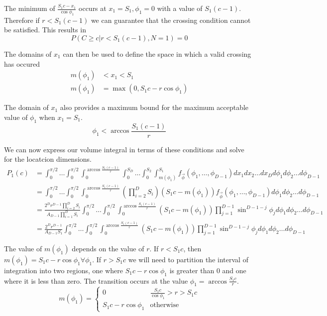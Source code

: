 \documentclass{article}
\begin{document}
The minimum of $\frac{S_1c - x_1}{\cos{\phi_1}}$ occurs at $x_1=S_1, \phi_1=0$ with a value of $S_1(c-1)$. Therefore if $r<S_1(c-1)$ we can guarantee that the crossing condition
cannot be satisfied. This results in
\begin{equation}
	P(C\ge c|r<S_1(c-1), N=1) = 0
\end{equation}

The domains of $x_1$ can then be used to define the space in which a valid crossing has occured 
\begin{align} 
	m(\phi_1) &< x_1 < S_1 \\ \label{eq:crossing condition 0}
	m(\phi_1) &= \max(0, S_1c-r\cos{\phi_1}) 
\end{align}

The domain of $x_1$ also provides a maximum bound for the maximum acceptable value of $\phi_1$ when $x_1 = S_1$.
\begin{equation}
	\phi_1 < \arccos{\frac{S_1(c-1)}{r}}
\end{equation}


We can now express our volume integral in terms of these conditions and solve for the locatcion dimensions.
\begin{align} \label{eq:volume integral}
	P_1(c) &= \int_0^{\pi/2} \hdots \int_0^{\pi/2} \int_0^{\arccos{\frac{S_1(c-1)}{r}}}\int_0^{S_D} \hdots \int_0^{S_2} \int_{m(\phi_1)}^{S_1} f_{\vec\phi}(\phi_1,\hdots,\phi_{D-1})dx_1 dx_2 \hdots dx_D d\phi_1 d\phi_2 \hdots d\phi_{D-1}\\
	&= \int_0^{\pi/2} \hdots \int_0^{\pi/2}\int_0^{\arccos{\frac{S_1(c-1)}{r}}}\left(\prod_{i=2}^DS_i\right)\left(S_1c-m(\phi_1)\right)  f_{\vec\phi}(\phi_1,\hdots,\phi_{D-1}) d\phi_1 d\phi_2 \hdots d\phi_{D-1} \\
	&= \frac{ 2^Dr^{D-1} \prod_{i=2}^DS_i}{A_{D-1}\prod_{i=1}^DS_i}\int_0^{\pi/2} \hdots \int_0^{\pi/2}\int_0^{\arccos{\frac{S_1(c-1)}{r}}} (S_1c-m(\phi_1)) \prod_{j=1}^{D-1}\sin^{D-1-j}\phi_j d\phi_1 d\phi_2\hdots d\phi_{D-1}\\
	&= \frac{ 2^Dr^{D-1}}{A_{D-1}S_1}\int_0^{\pi/2} \hdots \int_0^{\pi/2}\int_0^{\arccos{\frac{S_1(c-1)}{r}}} (S_1c-m(\phi_1)) \prod_{j=1}^{D-1}\sin^{D-1-j}\phi_j d\phi_1 d\phi_2 \hdots d\phi_{D-1}
\end{align}

The value of $m(\phi_1)$ depends on the value of $r$. If $r<S_1c$, then $m(\phi_1)=S_1c-r\cos \phi_1 \forall \phi_1$. If $r>S_1c$ we will need to partition the interval of integration into
two regions, one where $S_1c-r\cos{\phi_1}$ is greater than 0 and one where it is less than zero. The transition occurs at the value $\phi_1 = \arccos{\frac{S_1c}{r}}$.
\begin{equation}
	m(\phi_1) = \begin{cases}
		0 & \frac{S_1c}{\cos\phi_1}>r>S_1c\\
		S_1c - r\cos{\phi_1} & \text{otherwise}
	\end{cases}
\end{equation}
\end{document}
